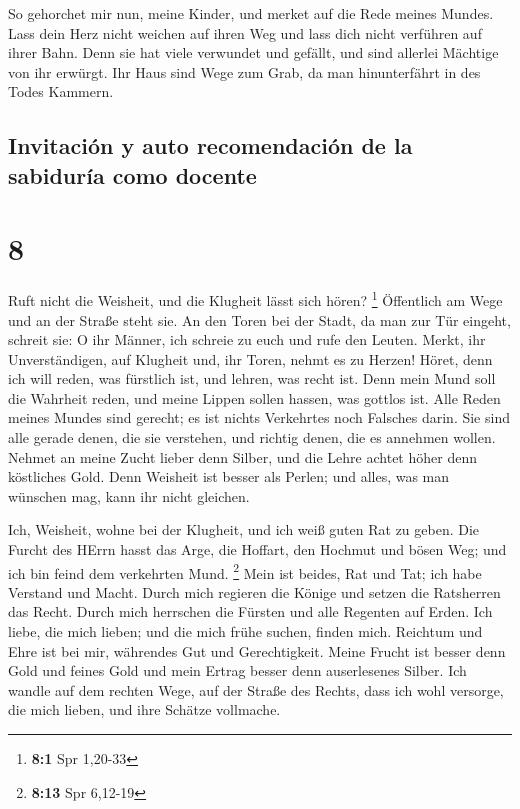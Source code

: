  So gehorchet mir nun, meine Kinder, und merket auf die
Rede meines Mundes.  Lass dein Herz nicht weichen auf
ihren Weg und lass dich nicht verführen auf ihrer Bahn. 
Denn sie hat viele verwundet und gefällt, und sind allerlei Mächtige von
ihr erwürgt.  Ihr Haus sind Wege zum Grab, da man
hinunterfährt in des Todes Kammern.

\hypertarget{invitaciuxf3n-y-auto-recomendaciuxf3n-de-la-sabiduruxeda-como-docente}{%
\subsection{Invitación y auto recomendación de la sabiduría como
docente}\label{invitaciuxf3n-y-auto-recomendaciuxf3n-de-la-sabiduruxeda-como-docente}}

\hypertarget{section-7}{%
\section{8}\label{section-7}}

 Ruft nicht die Weisheit, und die Klugheit lässt sich
hören? \footnote{\textbf{8:1} Spr 1,20-33}  Öffentlich am
Wege und an der Straße steht sie.  An den Toren bei der
Stadt, da man zur Tür eingeht, schreit sie:  O ihr Männer,
ich schreie zu euch und rufe den Leuten.  Merkt, ihr
Unverständigen, auf Klugheit und, ihr Toren, nehmt es zu Herzen!
 Höret, denn ich will reden, was fürstlich ist, und
lehren, was recht ist.  Denn mein Mund soll die Wahrheit
reden, und meine Lippen sollen hassen, was gottlos ist. 
Alle Reden meines Mundes sind gerecht; es ist nichts Verkehrtes noch
Falsches darin.  Sie sind alle gerade denen, die sie
verstehen, und richtig denen, die es annehmen wollen. 
Nehmet an meine Zucht lieber denn Silber, und die Lehre achtet höher
denn köstliches Gold.  Denn Weisheit ist besser als
Perlen; und alles, was man wünschen mag, kann ihr nicht gleichen.

 Ich, Weisheit, wohne bei der Klugheit, und ich weiß
guten Rat zu geben.  Die Furcht des HErrn hasst das Arge,
die Hoffart, den Hochmut und bösen Weg; und ich bin feind dem verkehrten
Mund. \footnote{\textbf{8:13} Spr 6,12-19}  Mein ist
beides, Rat und Tat; ich habe Verstand und Macht.  Durch
mich regieren die Könige und setzen die Ratsherren das Recht.
 Durch mich herrschen die Fürsten und alle Regenten auf
Erden.  Ich liebe, die mich lieben; und die mich frühe
suchen, finden mich.  Reichtum und Ehre ist bei mir,
währendes Gut und Gerechtigkeit.  Meine Frucht ist besser
denn Gold und feines Gold und mein Ertrag besser denn auserlesenes
Silber.  Ich wandle auf dem rechten Wege, auf der Straße
des Rechts,  dass ich wohl versorge, die mich lieben, und
ihre Schätze vollmache.


